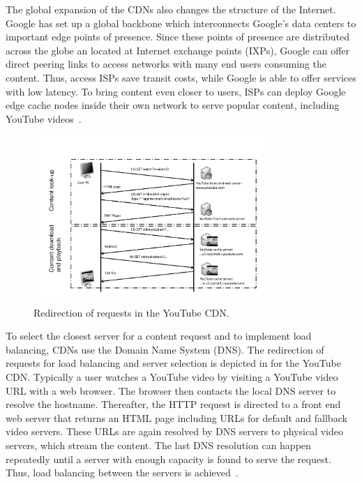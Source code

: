 The global expansion of the CDNs also changes the structure of the Internet.
Google has set up a global backbone which interconnects Google's data centers to important edge points of presence.
Since these points of presence are distributed across the globe an located at Internet exchange points (IXPs), Google can offer direct peering links to access networks with many end users consuming the content.
Thus, access ISPs save transit costs, while Google is able to offer services with low latency.
To bring content even closer to users, ISPs can deploy Google edge cache nodes inside their own network to serve popular content, including YouTube videos~\cite{gcc}.

\begin{figure}[bt]
\centering
\vspace{-0.2cm}
	\includegraphics[width=0.80\textwidth]{aslevel/figs/cacheServerSelection}
	\vspace{-0.2cm}
 	\caption{Redirection of requests in the YouTube CDN.}
 	\label{fig:aslevel:serverselection}
\end{figure}

To select the closest server for a content request and to implement load balancing, CDNs use the Domain Name System (DNS).
The redirection of requests for load balancing and server selection is depicted in  for the YouTube CDN.
Typically a user watches a YouTube video by visiting a YouTube video URL with a web browser.
The browser then contacts the local DNS server to resolve the hostname.
Thereafter, the HTTP request is directed to a front end web server that returns an HTML page including URLs for default and fallback video servers.
These URLs are again resolved by DNS servers to physical video servers, which stream the content.
The last DNS resolution can happen repeatedly until a server with enough capacity is found to serve the request.
Thus, load balancing between the servers is achieved~\cite{adhikari2012vivisecting}.

